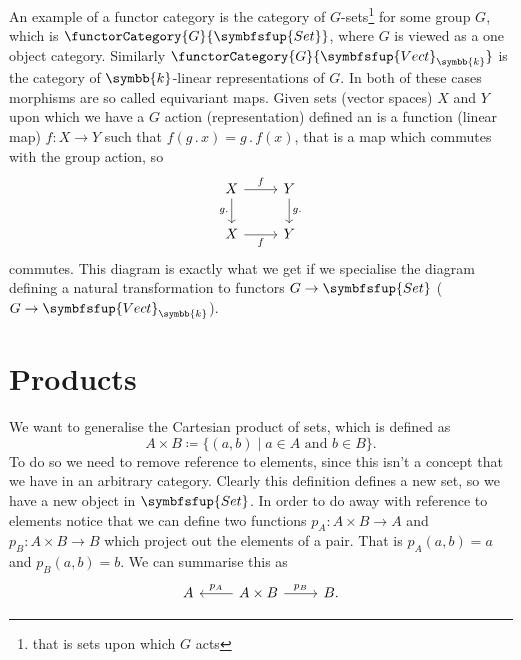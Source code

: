 \documentclass[fleqn]{NotesClass}
\makeatletter
\newcommand{\c@egory}[1]{\symbfsfup{#1}}
\newcommand{\Set}{\c@egory{Set}}
\renewcommand{\field}{\symbb{k}}
\newcommand{\Vect}[1][\field]{{\c@egory{Vect}_{#1}}}
\makeatother
\begin{document}
    An example of a functor category is the category of \(G\)-sets\footnote{that is sets upon which \(G\) acts} for some group \(G\), which is \(\functorCategory{G}{\Set}\), where \(G\) is viewed as a one object category.
    Similarly \(\functorCategory{G}{\Vect}\) is the category of \(\field\)-linear representations of \(G\).
    In both of these cases morphisms are so called equivariant maps.
    Given sets (vector spaces) \(X\) and \(Y\) upon which we have a \(G\) action (representation) defined an  is a function (linear map) \(f \colon X \to Y\) such that \(f(g \mathbin{.} x) = g \mathbin{.} f(x)\), that is a map which commutes with the group action, so
    \begin{equation}
        \begin{tikzcd}
            X \arrow[r, "f"] \arrow[d, "g \mathbin{.} {}"'] & Y \arrow[d, "g \mathbin{.} {}"]\\
            X \arrow[r, "f"'] & Y
        \end{tikzcd}
    \end{equation}
    commutes.
    This diagram is exactly what we get if we specialise the diagram defining a natural transformation to functors \(G \to \Set\) (\(G \to \Vect\)).
    
    \section{Products}
    We want to generalise the Cartesian product of sets, which is defined as
    \begin{equation}
        A \times B \coloneqq \{(a, b) \mid a \in A \text{ and } b \in B\}.
    \end{equation}
    To do so we need to remove reference to elements, since this isn't a concept that we have in an arbitrary category.
    Clearly this definition defines a new set, so we have a new object in \(\Set\).
    In order to do away with reference to elements notice that we can define two functions \(p_A \colon A \times B \to A\) and \(p_B \colon A \times B \to B\) which project out the elements of a pair.
    That is \(p_A(a, b) = a\) and \(p_B(a, b) = b\).
    We can summarise this as
    \begin{equation}
        \begin{tikzcd}
            A & A \times B \arrow[l, "p_A"'] \arrow[r, "p_B"] & B.
        \end{tikzcd}
    \end{equation}
    
\end{document}
